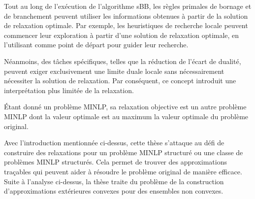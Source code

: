 Tout au long de l'exécution de l'algorithme sBB, les règles primales de bornage et de branchement peuvent utiliser les informations obtenues à partir de la solution de relaxation optimale. Par exemple, les heuristiques de recherche locale peuvent commencer leur exploration à partir d'une solution de relaxation optimale, en l'utilisant comme point de départ pour guider leur recherche.

Néanmoins, des tâches spécifiques, telles que la réduction de l'écart de dualité, peuvent exiger exclusivement une limite duale locale sans nécessairement nécessiter la solution de relaxation. Par conséquent, ce concept introduit une interprétation plus limitée de la relaxation.

\begin{definition}
     Étant donné un problème MINLP, sa relaxation objective est un autre problème MINLP dont la valeur optimale est au maximum la valeur optimale du problème original.
\end{definition}

Avec l'introduction mentionnée ci-dessus, cette thèse s'attaque au défi de construire des relaxations pour un problème MINLP structuré ou une classe de problèmes MINLP structurés. Cela permet de trouver des approximations traçables qui peuvent aider à résoudre le problème original de manière efficace. Suite à l'analyse ci-dessus, la thèse traite du problème de la construction d'approximations extérieures convexes pour des ensembles non convexes.

